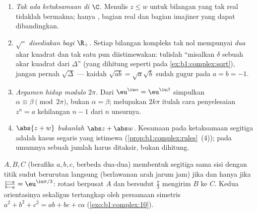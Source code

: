 \begin{remark}\label{rem:b1:complex:pitfalls}
\begin{enumerate}
  \item \emph{Tak ada ketaksamaan di $\C$.} Menulis $z \leq w$ untuk
        bilangan yang tak real tidaklah bermakna; hanya , bagian real
        dan bagian imajiner yang dapat dibandingkan.
  \item \emph{$\sqrt{\phantom z}$ disediakan bagi $\R_+$.} Setiap
        bilangan kompleks tak nol mempunyai \emph{dua} akar kuadrat dan
        tak satu pun diistimewakan: tulislah ``misalkan $\delta$ sebuah akar
        kuadrat dari $\Delta$'' (yang dihitung seperti pada
        \cref{ex:b1:complex:sqrt}), jangan pernah $\sqrt\Delta$ ---
        kaidah $\sqrt{ab} = \sqrt a\sqrt b$ sudah gugur pada
        $a = b = -1$.
  \item \emph{Argumen hidup modulo $2\pi$.} Dari
        $\eu^{\iu\alpha} = \eu^{\iu\beta}$ simpulkan $\alpha
        \equiv \beta \pmod{2\pi}$, bukan $\alpha = \beta$;
        melupakan $2k\pi$ itulah cara  penyelesaian $z^n = a$
        kehilangan $n - 1$ dari $n$ unsurnya.
  \item \emph{$\abs{z + w}$ bukanlah $\abs z + \abs w$.} Kesamaan
        pada ketaksamaan segitiga adalah kasus segaris yang
        istimewa (\cref{prop:b1:complex:rules}~(4)); pada umumnya
         sebuah jumlah harus ditaksir, bukan dihitung.
\end{enumerate}
\end{remark}

\begin{example}\label{ex:b1:complex:equilateral}
$A, B, C$ (berafiks $a, b, c$, berbeda dua-dua) membentuk segitiga
sama sisi dengan titik sudut berurutan langsung (berlawanan arah jarum jam) jika dan
hanya jika $\frac{c - a}{b - a} = \eu^{\iu\pi/3}$: rotasi
berpusat $A$ dan bersudut $\frac\pi3$ mengirim $B$ ke $C$. Kedua orientasinya
sekaligus tertangkap oleh persamaan simetris $a^2 + b^2 + c^2 = ab
+ bc + ca$ (\cref{exo:b1:complex:10}).
\end{example}

